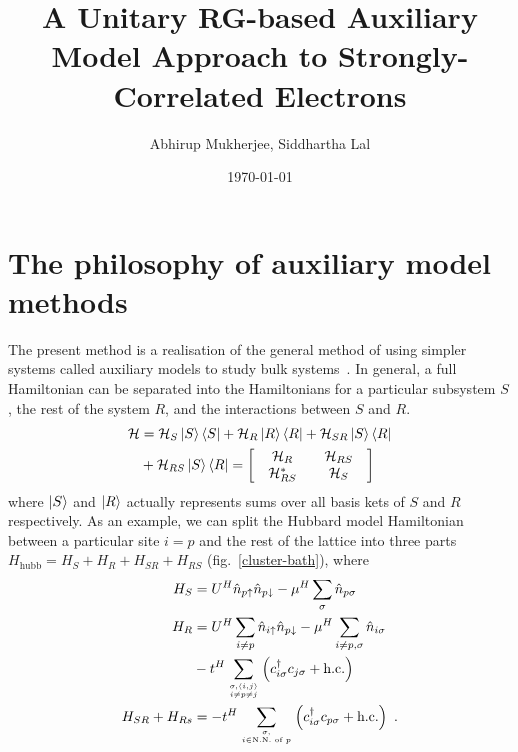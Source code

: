 \documentclass[reprint,hidelinks,onecolumn]{revtex4-2}
\begin{document}
\title{\bf A Unitary RG-based Auxiliary Model Approach to Strongly-Correlated Electrons}
\author{Abhirup Mukherjee, Siddhartha Lal}
\date{\today}
\maketitle
\tableofcontents

\section{The philosophy of auxiliary model methods}

The present method is a realisation of the general method of using simpler systems called auxiliary models to study bulk systems~\cite{martin_2016}. In general, a full Hamiltonian can be separated into the Hamiltonians for a particular subsystem \(S\), the rest of the system \(R\), and the interactions between \(S\) and \(R\).
\begin{equation}\begin{aligned}
	\mathcal{H} &= \mathcal{H}_S\ket{S}\bra{S} + \mathcal{H}_R \ket{R}\bra{R} + \mathcal{H}_{SR} \ket{S}\bra{R} \\
				&+ \mathcal{H}_{RS}\ket{S}\bra{R} = \begin{bmatrix} & \mathcal{H}_{R} && \mathcal{H}_{RS} & \\ & \mathcal{H}_{RS}^* && \mathcal{H}_{S} & \end{bmatrix}
\end{aligned}\end{equation}
where \(\ket{S}\) and \(\ket{R}\) actually represents sums over all basis kets of \(S\) and \(R\) respectively. As an example, we can split the Hubbard model Hamiltonian between a particular site \(i = p\) and the rest of the lattice into three parts \(H_\text{hubb} = H_S + H_R + H_{SR} + H_{RS}\) (fig.~\ref{cluster-bath}), where
\begin{equation}\begin{aligned}
	H_S &= U^H\hat n_{p \uparrow} \hat n_{p \downarrow} - \mu^H \sum_\sigma \hat n_{p \sigma}\\
	H_R &= U^H\sum_{i \neq p}\hat n_{i \uparrow} \hat n_{p \downarrow} - \mu^H \sum_{i \neq p, \sigma} \hat n_{i \sigma} \\
		&-t^H\sum_{\sigma,\left<i,j \right>\atop{i \neq p \neq j}}\left(c^\dagger_{i\sigma} c_{j\sigma} + \text{h.c.}\right) \\
	H_{SR} + H_{Rs} &= - t^H\sum_{\sigma,\atop{i \in \text{N.N. of }p}}\left(c^\dagger_{i\sigma} c_{p\sigma} + \text{h.c.}\right)~.
\end{aligned}\end{equation}
\end{document}

